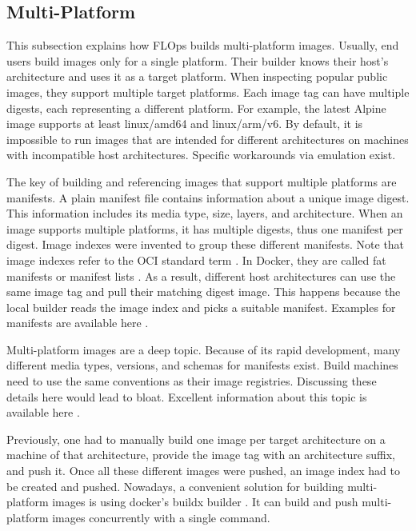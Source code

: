 \subsection{Multi-Platform}

This subsection explains how FLOps builds multi-platform images.
Usually, end users build images only for a single platform.
Their builder knows their host's architecture and uses it as a target platform.
When inspecting popular public images, they support multiple target platforms.
Each image tag can have multiple digests, each representing a different platform.
For example, the latest Alpine image \cite{alpine_multiplatform_image} supports at least linux/amd64 and linux/arm/v6.
By default, it is impossible to run images that are intended for different architectures on machines with incompatible host architectures.
Specific workarounds via emulation exist.

The key of building and referencing images that support multiple platforms are manifests.
A plain manifest file contains information about a unique image digest.
This information includes its media type, size, layers, and architecture.
When an image supports multiple platforms, it has multiple digests, thus one manifest per digest.
Image indexes were invented to group these different manifests.
Note that image indexes refer to the OCI standard term \cite{oci_image_index}.
In Docker, they are called fat manifests or manifest lists \cite{docs:docker_manifest}.
As a result, different host architectures can use the same image tag and pull their matching digest image.
This happens because the local builder reads the image index and picks a suitable manifest.
Examples for manifests are available here \cite{docs:docker_manifest}.

Multi-platform images are a deep topic.
Because of its rapid development, many different media types, versions, and schemas for manifests exist.
Build machines need to use the same conventions as their image registries.
Discussing these details here would lead to bloat.
Excellent information about this topic is available here \cite{docs:image_manifest_versions_schemas}.

Previously, one had to manually build one image per target architecture on a machine of that architecture, provide the image tag with an architecture suffix, and push it.
Once all these different images were pushed, an image index had to be created and pushed.
Nowadays, a convenient solution for building multi-platform images is using docker's buildx builder \cite{docs:docker_buildx}.
It can build and push multi-platform images concurrently with a single command.

